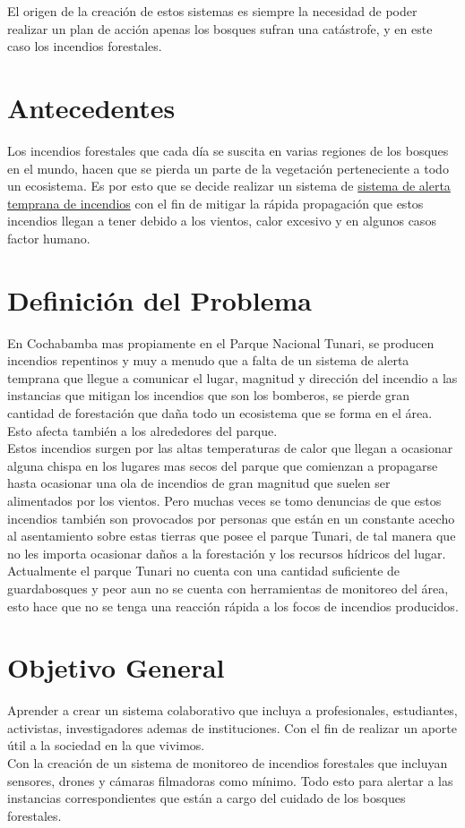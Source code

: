 \documentclass[letter,12pt]{article}
\begin{document}
El origen de la creación de estos sistemas es siempre la necesidad de poder realizar un plan de acción apenas los bosques sufran una catástrofe, y en este caso los incendios forestales.
\section{Antecedentes}
Los incendios forestales que cada día se suscita en varias regiones de los bosques en el mundo, hacen que se pierda un parte de la vegetación perteneciente a todo un ecosistema. Es por esto que se decide realizar un sistema de \underline{sistema de alerta temprana de incendios} con el fin de mitigar la rápida propagación que estos incendios llegan a tener debido a los vientos, calor excesivo y en algunos casos factor humano. 
\section{Definici\'on del Problema}
En Cochabamba mas propiamente en el Parque Nacional Tunari, se producen incendios repentinos y muy a menudo que a falta de un sistema de alerta temprana que llegue a comunicar el lugar, magnitud y dirección del incendio a las instancias que mitigan los incendios que son los bomberos, se pierde gran cantidad de forestación que daña todo un ecosistema que se forma en el área. Esto afecta también a los alrededores del parque.\\

Estos incendios surgen por las altas temperaturas de calor que llegan a ocasionar alguna chispa en los lugares mas secos del parque que comienzan a propagarse hasta ocasionar una ola de incendios de gran magnitud que suelen ser alimentados por los vientos. Pero muchas veces se tomo denuncias de que estos incendios también son provocados por personas que están en un constante acecho al asentamiento sobre estas tierras que posee el parque Tunari, de tal manera que no les importa ocasionar daños a la forestación y los recursos hídricos del lugar.\\

Actualmente el parque Tunari no cuenta con una cantidad suficiente de guardabosques y peor aun no se cuenta con herramientas de monitoreo del área, esto hace que no se tenga una reacción rápida a los focos de incendios producidos. 

\section{Objetivo General}
Aprender a crear un sistema colaborativo que incluya a profesionales, estudiantes, activistas, investigadores ademas de instituciones. Con el fin de realizar un aporte útil a la sociedad en la que vivimos.\\
Con la creación de un sistema de monitoreo de incendios forestales que incluyan sensores, drones y cámaras filmadoras como mínimo. Todo esto para alertar a las instancias correspondientes que están a cargo del cuidado de los bosques forestales.\\
\end{document}
